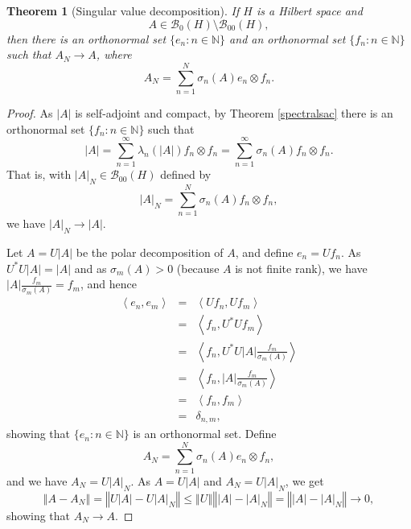 \documentclass{article}
\newcommand{\inner}[2]{\left\langle #1, #2 \right\rangle}
\newcommand{\norm}[1]{\left\Vert #1 \right\Vert}
\newtheorem{theorem}{Theorem}
\theoremstyle{definition}
\begin{document}
\begin{theorem}[Singular value decomposition]
If $H$ is a Hilbert space and
\[
A \in \mathscr{B}_0(H) \setminus \mathscr{B}_{00}(H),
\]
then there is an orthonormal set $\{e_n: n \in \mathbb{N}\}$ and
an orthonormal set $\{f_n: n\in \mathbb{N}\}$ such that
$A_N \to A$, where
\[
A_N = \sum_{n=1}^N \sigma_n(A) e_n \otimes f_n.
\]
\end{theorem}
\begin{proof}
As $|A|$ is self-adjoint and compact, 
by Theorem \ref{spectralsac} there is an orthonormal set $\{f_n: n \in \mathbb{N}\}$ such that
\[
|A|= \sum_{n=1}^\infty \lambda_n(|A|)  f_n \otimes f_n=\sum_{n=1}^\infty \sigma_n(A) f_n \otimes f_n.
\]
That is, with $|A|_N \in \mathscr{B}_{00}(H)$ defined by
\[
|A|_N = \sum_{n=1}^N \sigma_n(A) f_n \otimes f_n,
\]
we have $|A|_N \to |A|$.

Let $A=U|A|$ be the polar decomposition of $A$, and
define $e_n=Uf_n$.
As $U^*U|A|=|A|$ and as $\sigma_m(A) >0$ (because $A$ is not finite rank), we have $|A|\frac{f_m}{\sigma_m(A)}=f_m$, and hence
\begin{eqnarray*}
\inner{e_n}{e_m}&=&\inner{Uf_n}{Uf_m}\\
&=&\inner{f_n}{U^*Uf_m}\\
&=&\inner{f_n}{U^*U|A|\frac{f_m}{\sigma_m(A)}}\\
&=&\inner{f_n}{|A|\frac{f_m}{\sigma_m(A)}}\\
&=&\inner{f_n}{f_m}\\
&=&\delta_{n,m},
\end{eqnarray*}
showing that $\{e_n: n \in \mathbb{N}\}$ is an orthonormal set.
Define
\[
A_N = \sum_{n=1}^N \sigma_n(A) e_n \otimes f_n,
\]
and we have $A_N = U|A|_N$. As $A=U|A|$ and $A_N=U|A|_N$, we get
\[
\norm{A-A_N} = \norm{U|A|-U|A|_N} \leq \norm{U} \norm{|A|-|A|_N} = \norm{|A|-|A|_N} \to 0,
\]
showing that $A_N \to A$.
\end{proof}
\end{document}
